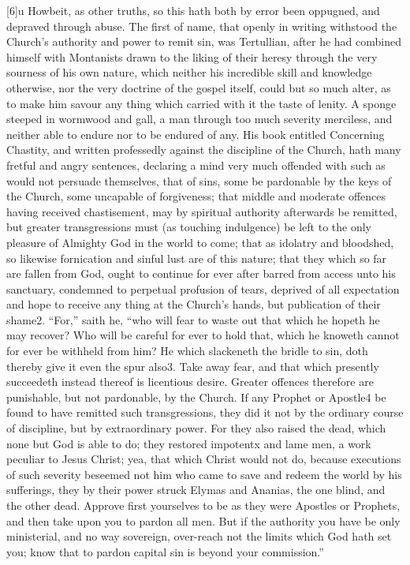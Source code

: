 [6]u Howbeit, as other truths, so this hath both by error been oppugned, and depraved through abuse. The first of name, that openly in writing withstood the Church’s authority and power to remit sin, was Tertullian, after he had combined himself with Montanists drawn to the liking of their heresy through the very sourness of his own nature, which neither his incredible skill and knowledge otherwise, nor the very doctrine of the gospel itself, could but so much alter, as to make him savour any thing which carried with it the taste of lenity. A sponge steeped in wormwood and gall, a man through too much severity merciless, and neither able to endure nor to be endured of any. His book entitled Concerning Chastity, and written professedly against the discipline of the Church, hath many fretful and angry sentences, declaring a mind very much offended with such as would not persuade themselves, that of sins, some be pardonable by the keys of the Church, some uncapable of forgiveness; that middle and moderate offences having received chastisement, may by spiritual authority afterwards be remitted, but greater transgressions must (as touching indulgence) be left to the only pleasure of Almighty God in the world to come; that as idolatry and bloodshed, so likewise fornication and sinful lust  are of this nature; that they which so far are fallen from God, ought to continue for ever after barred from access unto his sanctuary, condemned to perpetual profusion of tears, deprived of all expectation and hope to receive any thing at the Church’s hands, but publication of their shame2. “For,” saith he, “who will fear to waste out that which he hopeth he may recover? Who will be careful for ever to hold that, which he knoweth cannot for ever be withheld from him? He which slackeneth the bridle to sin, doth thereby give it even the spur also3. Take away fear, and that which presently succeedeth instead thereof is licentious desire. Greater offences therefore are punishable, but not pardonable, by the Church. If any Prophet or Apostle4 be found to have remitted such transgressions, they did it not by the ordinary course of discipline, but by extraordinary power. For they also raised the dead, which none but God is able to do; they restored impotentx and lame men, a work peculiar to Jesus Christ; yea, that which Christ would not do, because executions of such severity beseemed not him who came to save and redeem the world by his sufferings, they by their power struck Elymas and Ananias, the one blind, and the other dead. Approve first yourselves to be as they were  Apostles or Prophets, and then take upon you to pardon all men. But if the authority you have be only ministerial, and no way sovereign, over-reach not the limits which God hath set you; know that to pardon capital sin is beyond your commission.”

